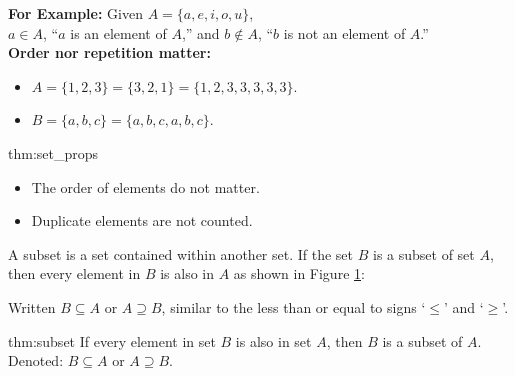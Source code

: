 \noindent
\textbf{For Example:} Given $A = \{a, e, i, o, u\}$,\\
$a \in A$, ``$a$ is an element of $A$,'' and
$b \notin A$, ``$b$ is not an element of $A$.''\\

\noindent
\textbf{Order nor repetition matter:}
\begin{itemize}
    \item $A = \{1, 2, 3\} = \{3, 2, 1\} = \{1, 2, 3, 3, 3, 3, 3\}$.
    \item $B = \{a, b, c\} = \{a, b, c, a, b, c\}$.
\end{itemize}

\begin{theo}{thm:set_props}
    \begin{itemize}
        \item The order of elements do not matter.
        \item Duplicate elements are not counted.
    \end{itemize}
\end{theo}


A subset is a set contained within another set. If the set $B$ is a subset of set $A$,
then every element in $B$ is also in $A$ as shown in Figure \ref{fig:subset}:


\begin{figure}[ht]
    \centering
    \caption{}
    \label{fig:subset}
\end{figure}


\noindent
Written $B \subseteq A$ or $A \supseteq B$, similar to the less than or
equal to signs `$\leq$' and `$\geq$'.

\newpage

\begin{theo}[Subset]{thm:subset}
    If every element in set $B$ is also in set $A$, then $B$ is a subset of $A$.\\
    Denoted: $B \subseteq A$ or $A \supseteq B$.
\end{theo}

